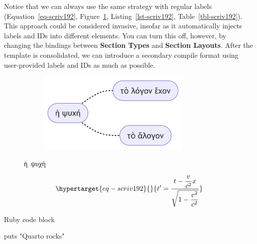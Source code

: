 \documentclass[
  12pt,
  a4paper,
  oneside,
  titlepage,
  toclink=all,
  toc=bibliography]{scrbook}
\newenvironment{Shaded}{\begin{snugshade}}{\end{snugshade}}
\newcommand{\FunctionTok}[1]{\textcolor[rgb]{0.28,0.35,0.67}{#1}}
\newcommand{\StringTok}[1]{\textcolor[rgb]{0.13,0.47,0.30}{#1}}
\theoremstyle{plain}
\theoremstyle{definition}
\theoremstyle{definition}
\theoremstyle{plain}
\theoremstyle{plain}
\theoremstyle{plain}
\theoremstyle{definition}
\theoremstyle{plain}
\theoremstyle{remark}
\begin{document}
\protect\hypertarget{scriv192}{}{}

Notice that we can always use the same strategy with regular labels
(\protect\hypertarget{cite_55}{}{\label{cite_55}Equation~\ref{eq-scriv192}},
\protect\hypertarget{cite_56}{}{\label{cite_56}Figure~\ref{fig-scriv192}},
\protect\hypertarget{cite_57}{}{\label{cite_57}Listing~\ref{lst-scriv192}},
\protect\hypertarget{cite_58}{}{\label{cite_58}Table~\ref{tbl-scriv192}}).
This approach could be considered invasive, insofar as it automatically
injects labels and IDs into different elements. You can turn this off,
however, by changing the bindings between \textbf{Section Types} and
\textbf{Section Layouts}. After the template is consolidated, we can
introduce a secondary compile format using user-provided labels and IDs
as much as possible.

\begin{figure}

{\centering 

\begin{figure}[H]

{\centering \includegraphics[width=2.89in,height=1.52in]{export_files/figure-latex/mermaid-figure-2.png}

}

\end{figure}

}

\caption{\label{fig-scriv192}ἡ~ψυχή}

\end{figure}

\begin{equation}\protect\hypertarget{eq-scriv192}{}{t' = \frac{t - \dfrac{v}{c^{2}}x}{\sqrt{1 - \dfrac{v^{2}}{c^{2}}}}}\label{eq-scriv192}\end{equation}

\begin{codelisting}

\caption{Ruby code block}

\hypertarget{lst-scriv192}{%
\label{lst-scriv192}}%
\begin{Shaded}
\begin{Highlighting}[numbers=left,,]
\FunctionTok{puts} \StringTok{"Quarto rocks"}
\end{Highlighting}
\end{Shaded}

\end{codelisting}
\end{document}
